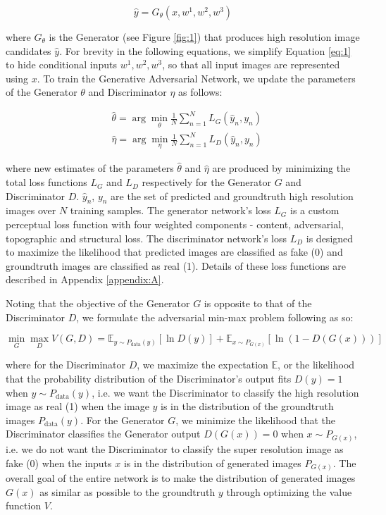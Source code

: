 \documentclass[tc, manuscript]{copernicus}
\begin{document}
\begin{equation}\label{eq:1}
  \hat{y} = G_\theta(x, w^1, w^2, w^3)
\end{equation}

where $G_\theta$ is the Generator (see Figure \ref{fig:1}) that produces high resolution image candidates $\hat{y}$.
For brevity in the following equations, we simplify Equation \eqref{eq:1} to hide conditional inputs $w^1, w^2, w^3$, so that all input images are represented using $x$.
To train the Generative Adversarial Network, we update the parameters of the Generator $\theta$ and Discriminator $\eta$ as follows:

\begin{align}
  & \hat{\theta} = \arg\min_{\theta} \frac{1}{N}\sum_{n=1}^{N}L_G(\hat{y}_n, y_n) \label{eq:2}\\
  & \hat{\eta} = \arg\min_{\eta} \frac{1}{N}\sum_{n=1}^{N}L_D(\hat{y}_n, y_n) \label{eq:3}
\end{align}

where new estimates of the parameters $\hat{\theta}$ and $\hat{\eta}$ are produced by minimizing the total loss functions $L_G$ and $L_D$ respectively for the Generator $G$ and Discriminator $D$.
$\hat{y}_n$, $y_n$ are the set of predicted and groundtruth high resolution images over $N$ training samples.
The generator network's loss $L_G$ is a custom perceptual loss function with four weighted components - content, adversarial, topographic and structural loss.
The discriminator network's loss $L_D$ is designed to maximize the likelihood that predicted images are classified as fake (0) and groundtruth images are classified as real (1).
Details of these loss functions are described in Appendix \ref{appendix:A}.

Noting that the objective of the Generator $G$ is opposite to that of the Discriminator $D$, we formulate the adversarial min-max problem following \citet{GoodfellowGenerativeAdversarialNetworks2014} as so:

\begin{equation}\label{eq:4}
  \min_{G} \max_{D} V(G,D) = \mathbb{E}_{y \sim P_{\text{data}}(y)}[\ln D(y)] + \mathbb{E}_{x \sim P_{G(x)}}[\ln(1-D(G(x)))]
\end{equation}

where for the Discriminator $D$, we maximize the expectation $\mathbb{E}$, or the likelihood that the probability distribution of the Discriminator's output fits $D(y)=1$ when $y \sim P_{\text{data}}(y)$, i.e. we want the Discriminator to classify the high resolution image as real (1) when the image $y$ is in the distribution of the groundtruth images $P_{\text{data}}(y)$.
For the Generator $G$, we minimize the likelihood that the Discriminator classifies the Generator output $D(G(x))=0$ when $x \sim P_{G(x)}$, i.e. we do not want the Discriminator to classify the super resolution image as fake (0) when the inputs $x$ is in the distribution of generated images $P_{G(x)}$.
The overall goal of the entire network is to make the distribution of generated images $G(x)$ as similar as possible to the groundtruth $y$ through optimizing the value function $V$.
\end{document}
